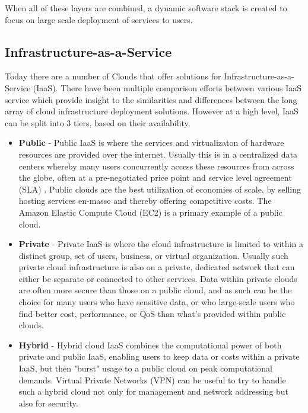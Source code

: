 When all of these layers are combined, a dynamic software stack is created to focus on large scale deployment of services to users.



\subsection{Infrastructure-as-a-Service}



Today there are a number of Clouds that offer solutions for Infrastructure-as-a-Service (IaaS).  There have been multiple comparison efforts between various IaaS service \cite{von2012comparison, aboveTheClouds, rimal2009taxonomy, sotomayorvirtual } which provide insight to the similarities and differences between the long array of cloud infrastructure deployment solutions.  However at a high level, IaaS can be split into 3 tiers, based on their availability.  

\begin{itemize}
\item \textbf{Public} - Public IaaS is where the services and virtualizaton of hardware resources are provided over the internet. Usually this is in a centralized data centers whereby many users concurrently access these resources from across the globe, often at a pre-negotiated price point and service level agreement (SLA) \cite{baset2012cloud}.  Public clouds are the best utilization of economies of scale, by selling hosting services en-masse and thereby offering competitive costs. The Amazon Elastic Compute Cloud (EC2) is a primary example of a public cloud.    

\item \textbf{Private} - Private IaaS is where the cloud infrastructure is limited to within a distinct group, set of users, business, or virtual organization. Usually such private cloud infrastructure is also on a private, dedicated network that can either be separate or connected to other services. Data within private clouds are often more secure than those on a public cloud, and as such can be the choice for many users who have sensitive data, or who large-scale users who find better cost, performance, or QoS than what's provided  within public clouds.

\item \textbf{Hybrid} - Hybrid cloud IaaS combines the computational power of both private and public IaaS, enabling users to keep data or costs within a private IaaS, but then "burst" usage to a public cloud on peak computational demands. Virtual Private Networks (VPN) can be useful to try to handle such a hybrid cloud not only for management and network addressing but also for security.  

\end{itemize}

